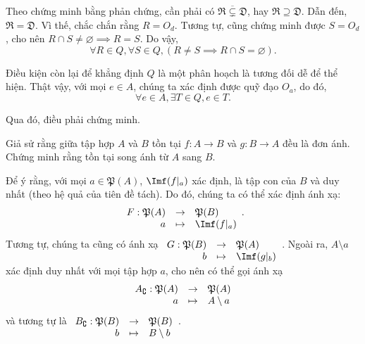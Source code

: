 Theo chứng minh bằng phản chứng, cần phải có $\overline{\mathfrak{R} \subsetneq \mathfrak{D}}$, hay $\mathfrak{R} \supseteq \mathfrak{D}$. Dẫn đến, $\mathfrak{R} = \mathfrak{D}$. Vì thế, chắc chắn rằng $R = O_d$. Tương tự, cũng chứng minh được $S = O_d$, cho nên $R \cap S \neq \varnothing \implies R = S$. Do vậy, \begin{equation*}
   \forall R \in Q, \forall S \in Q, (R \neq S \implies R \cap S = \varnothing).
\end{equation*}

Điều kiện còn lại để khẳng định $Q$ là một phân hoạch là tương đối dễ để thể hiện. Thật vậy, với mọi $e \in A$, chúng ta xác định được quỹ đạo $O_a$, do đó, \begin{equation*}
   \forall e \in A, \exists T \in Q, e \in T.
\end{equation*}

Qua đó, điều phải chứng minh.

\exercise Giả sử rằng giữa tập hợp $A$ và $B$ tồn tại $f: A \to B$ và $g: B \to A$ đều là đơn ánh. Chứng minh rằng tồn tại song ánh từ $A$ sang $B$.

\solution

Để ý rằng, với mọi $a \in \mathfrak{P}(A)$, $\Imf(f|_a)$ xác định, là tập con của $B$ và duy nhất (theo hệ quả của tiên đề tách). Do đó, chúng ta có thể xác định ánh xạ: \begin{equation*}
   \begin{array}[t]{rcl}
      F: \mathfrak{P}(A) & \to & \mathfrak{P}(B) \\
      a & \mapsto & \Imf(f|_a)
   \end{array}.
\end{equation*}
Tương tự, chúng ta cũng có ánh xạ $\begin{array}[t]{rcl}
   G: \mathfrak{P}(B) & \to & \mathfrak{P}(A) \\
   b & \mapsto & \Imf(g|_b)
\end{array}$. Ngoài ra, $A \setminus a$ xác định duy nhất với mọi tập hợp $a$, cho nên có thể gọi ánh xạ \begin{equation*}
   \begin{array}[t]{rcl}
      A_{\complement}: \mathfrak{P}(A) & \to & \mathfrak{P}(A) \\
      a & \mapsto & A \setminus a
   \end{array}
\end{equation*}
và tương tự là $\begin{array}[t]{rcl}
   B_{\complement}: \mathfrak{P}(B) & \to & \mathfrak{P}(B) \\
   b & \mapsto & B \setminus b
\end{array}$.

